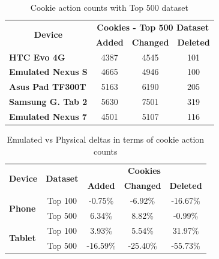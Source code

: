 \documentclass{acm_proc_article-sp}
\begin{document}
\begin{table}[htbp]
  \centering
  \caption{Cookie action counts with Top 500 dataset}
    \begin{tabular}{|c|c|c|c|}
    \hline
    \multicolumn{1}{|c|}{\multirow{2}[4]{*}{\textbf{Device}}} & \multicolumn{3}{|c|}{\textbf{Cookies - Top 500 Dataset}} \\ \cline{2-4}
    \multicolumn{1}{|c|}{} & \multicolumn{1}{|c|}{\textbf{Added}} & \multicolumn{1}{|c|}{\textbf{Changed}} & \multicolumn{1}{|c|}{\textbf{Deleted}} \\ \hline
    \multicolumn{1}{|l|}{\textbf{HTC Evo 4G}} & 4387  & 4545  & 101 \\
    \multicolumn{1}{|l|}{\textbf{Emulated Nexus S}} & 4665  & 4946  & 100 \\
    \multicolumn{1}{|l|}{\textbf{Asus Pad TF300T}} & 5163  & 6190  & 205 \\
    \multicolumn{1}{|l|}{\textbf{Samsung G. Tab 2}} & 5630  & 7501  & 319 \\
    \multicolumn{1}{|l|}{\textbf{Emulated Nexus 7}} & 4501  & 5107  & 116 \\ \hline
    \end{tabular}%
  \label{tab:addlabel}%
\end{table}%

\begin{table}[htbp]
  \centering
  \caption{Emulated vs Physical deltas in terms of cookie action counts}
    \begin{tabular}{|c|c|c|c|c|}
    \hline
    \multicolumn{1}{|c|}{\multirow{2}[4]{*}{\textbf{Device}}} & \multicolumn{1}{|c|}{\multirow{2}[4]{*}{\textbf{Dataset}}} & \multicolumn{3}{|c|}{\textbf{Cookies}} \\ \cline{3-5}
    \multicolumn{1}{|c|}{} & \multicolumn{1}{|c|}{} & \multicolumn{1}{|c|}{\textbf{Added}} & \multicolumn{1}{|c|}{\textbf{Changed}} & \multicolumn{1}{|c|}{\textbf{Deleted}} \\ \hline
    \multicolumn{1}{|l|}{\multirow{2}[4]{*}{\textbf{Phone}}} & Top 100 & -0.75\% & -6.92\% & -16.67\% \\
    \multicolumn{1}{|l|}{} & Top 500 & 6.34\% & 8.82\% & -0.99\% \\
    \hline
    \multicolumn{1}{|l|}{\multirow{2}[4]{*}{\textbf{Tablet}}} & Top 100 & 3.93\% & 5.54\% & 31.97\% \\
    \multicolumn{1}{|l|}{} & Top 500 & -16.59\% & -25.40\% & -55.73\% \\ \hline
    \end{tabular}%
  \label{tab:addlabel}%
\end{table}%
\end{document}
